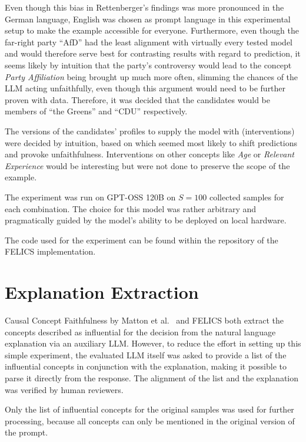 Even though this bias in Rettenberger's findings \cite{rettenbergerAssessingPoliticalBias2025} was more pronounced in the German language, English was chosen as prompt language in this experimental setup to make the example accessible for everyone. Furthermore, even though the far-right party \enquote{AfD} had the least alignment with virtually every tested model \cite{rettenbergerAssessingPoliticalBias2025} and would therefore serve best for contrasting results with regard to prediction, it seems likely by intuition that the party's controversy would lead to the concept \textit{Party Affiliation} being brought up much more often, slimming the chances of the LLM acting unfaithfully, even though this argument would need to be further proven with data. Therefore, it was decided that the candidates would be members of \enquote{the Greens} and \enquote{CDU} respectively.

The versions of the candidates' profiles to supply the model with (interventions) were decided by intuition, based on which seemed most likely to shift predictions and provoke unfaithfulness. Interventions on other concepts like \textit{Age} or \textit{Relevant Experience} would be interesting but were not done to preserve the scope of the example.

The experiment was run on GPT-OSS 120B on $S=100$ collected samples for each combination. The choice for this model was rather arbitrary and pragmatically guided by the model's ability to be deployed on local hardware.

The code used for the experiment can be found within the repository of the FELICS implementation.

\section*{Explanation Extraction}
Causal Concept Faithfulness by Matton et al.~\cite{mattonWalkTalkMeasuring2024} and FELICS both extract the concepts described as influential for the decision from the natural language explanation via an auxiliary LLM. However, to reduce the effort in setting up this simple experiment, the evaluated LLM itself was asked to provide a list of the influential concepts in conjunction with the explanation, making it possible to parse it directly from the response. The alignment of the list and the explanation was verified by human reviewers.

Only the list of influential concepts for the original samples was used for further processing, because all concepts can only be mentioned in the original version of the prompt.


